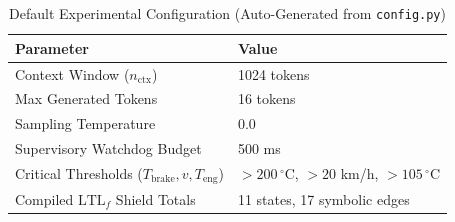 \begin{table}[t]
\centering
\caption{Default Experimental Configuration (Auto-Generated from \texttt{config.py})}
\label{tab:config}
\begin{tabular}{ll}
\toprule
\textbf{Parameter} & \textbf{Value} \\
\midrule
Context Window ($n_{\mathrm{ctx}}$) & 1024 tokens \\
Max Generated Tokens & 16 tokens \\
Sampling Temperature & 0.0 \\
Supervisory Watchdog Budget & 500 ms \\
Critical Thresholds ($T_{\mathrm{brake}}, v, T_{\mathrm{eng}}$) & $>200\,^\circ$C, $>20$ km/h, $>105\,^\circ$C \\
Compiled $\mathrm{LTL}_f$ Shield Totals & 11 states, 17 symbolic edges \\
\bottomrule
\end{tabular}
\end{table}
